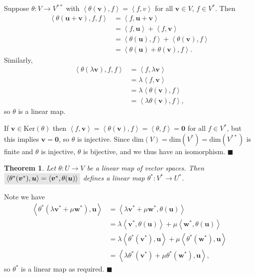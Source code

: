 \documentclass[letter-paper]{tufte-book}
\newtheorem{theorem}{\color{pastel-blue}Theorem}[section]
\newenvironment{proof}[1][Proof]{\begin{trivlist}
\item[\hskip \labelsep {\bfseries #1}]}{\end{trivlist}}
\newcommand{\inner}[2]{\left\langle #1, #2\right\rangle}
\newcommand{\Ob}{{\boldsymbol{0}}}
\newcommand{\ub}{{\boldsymbol{u}}}
\newcommand{\vb}{{\boldsymbol{v}}}
\newcommand{\wb}{{\boldsymbol{w}}}
\newcommand{\qed}{\hfill$\blacksquare$}
\newcommand{\highlight}[1]{\mathchoice%
  {\colorbox{black!10}{$\displaystyle#1$}}%
  {\colorbox{black!10}{$\textstyle#1$}}%
  {\colorbox{black!10}{$\scriptstyle#1$}}%
  {\colorbox{black!10}{$\scriptscriptstyle#1$}}}%
\begin{document}
\begin{proof}
  Suppose $\theta : V \to V^{**}$ with $\inner{\theta(\vb)}{f} = \inner{f}{v}$ for all $\vb \in V$, $f \in V^*$. Then
  \begin{align*}
    \inner{\theta(\ub+\vb), f}{f}
      &= \inner{f}{\ub+\vb}\\
      &= \inner{f}{\ub} + \inner{f}{\vb}\\
      &= \inner{\theta(\ub)}{f} + \inner{\theta(\vb)}{f}\\
      &= \inner{\theta(\ub) + \theta(\vb)}{f}.
  \end{align*}
  Similarly,
  \begin{align*}
    \inner{\theta(\lambda\vb), f}{f}
      &= \inner{f}{\lambda\vb}\\
      &= \lambda\inner{f}{\vb}\\
      &= \lambda\inner{\theta(\vb)}{f}\\
      &= \inner{\lambda\theta(\vb)}{f},
  \end{align*}
  so $\theta$ is a linear map.
  
  If $\vb \in \mbox{Ker}(\theta)$ then $\inner{f}{\vb} = \inner{\theta(\vb)}{f} = \inner{\theta}{f} = \Ob$ for all $f \in V^*$, but this implies $\vb = \Ob$, so $\theta$ is injective. Since $\mbox{dim}(V) = \mbox{dim}(V^*) = \mbox{dim}(V^{**})$ is finite and $\theta$ is injective, $\theta$ is bijective, and we thus have an isomorphism. \qed
\end{proof}

\begin{theorem}
  Let $\theta : U \to V$ be a linear map of vector spaces. Then $\highlight{\inner{\theta^*(\vb^*)}{\ub} = \inner{\vb^*}{\theta(\ub)}}$ defines a linear map $\theta^* : V^* \to U^*$.
\end{theorem}

\begin{proof}
  Note we have
  \begin{align*}
    \inner{\theta^*(\lambda\vb^* + \mu\wb^*)}{\ub}
      &= \inner{\lambda\vb^* + \mu\wb^*}{\theta(\ub)}\\
      &= \lambda\inner{\vb^*}{\theta(\ub)} + \mu\inner{\wb^*}{\theta(\ub)}\\
      &= \lambda\inner{\theta^*(\vb^*)}{\ub} + \mu\inner{\theta^*(\wb^*)}{\ub}\\
      &= \inner{\lambda\theta^*(\vb^*) + \mu\theta^*(\wb^*)}{\ub},
  \end{align*}
  so $\theta^*$ is a linear map as required. \qed
\end{proof}
\end{document}
